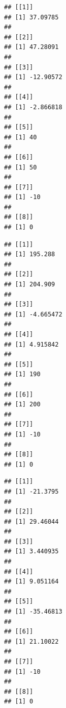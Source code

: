 \documentclass[
]{article}
\newenvironment{Shaded}{\begin{snugshade}}{\end{snugshade}}
\newcommand{\ControlFlowTok}[1]{\textcolor[rgb]{0.13,0.29,0.53}{\textbf{#1}}}
\newcommand{\FunctionTok}[1]{\textcolor[rgb]{0.00,0.00,0.00}{#1}}
\newcommand{\NormalTok}[1]{#1}
\newcommand{\SpecialCharTok}[1]{\textcolor[rgb]{0.00,0.00,0.00}{#1}}
\newcommand{\StringTok}[1]{\textcolor[rgb]{0.31,0.60,0.02}{#1}}
\begin{document}
\begin{verbatim}
## [[1]]
## [1] 37.09785
## 
## [[2]]
## [1] 47.28091
## 
## [[3]]
## [1] -12.90572
## 
## [[4]]
## [1] -2.866818
## 
## [[5]]
## [1] 40
## 
## [[6]]
## [1] 50
## 
## [[7]]
## [1] -10
## 
## [[8]]
## [1] 0
\end{verbatim}

\begin{Shaded}
\end{Shaded}

\begin{verbatim}
## [[1]]
## [1] 195.288
## 
## [[2]]
## [1] 204.909
## 
## [[3]]
## [1] -4.665472
## 
## [[4]]
## [1] 4.915842
## 
## [[5]]
## [1] 190
## 
## [[6]]
## [1] 200
## 
## [[7]]
## [1] -10
## 
## [[8]]
## [1] 0
\end{verbatim}

\begin{Shaded}
\end{Shaded}

\begin{verbatim}
## [[1]]
## [1] -21.3795
## 
## [[2]]
## [1] 29.46044
## 
## [[3]]
## [1] 3.440935
## 
## [[4]]
## [1] 9.051164
## 
## [[5]]
## [1] -35.46813
## 
## [[6]]
## [1] 21.10022
## 
## [[7]]
## [1] -10
## 
## [[8]]
## [1] 0
\end{verbatim}

\begin{Shaded}
\end{Shaded}
\end{document}

